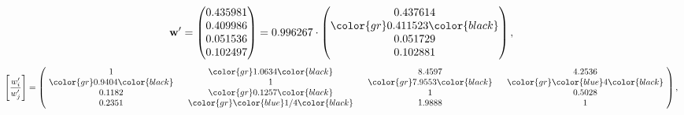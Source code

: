 \begin{example}
\begin{equation*}
\mathbf{w}^{\prime} =
\begin{pmatrix}
0.435981\\
0.409986\\
0.051536\\
0.102497
\end{pmatrix} =
0.996267\cdot
\begin{pmatrix}
0.437614\\
\color{gr} 0.411523\color{black} \\
0.051729\\
0.102881
\end{pmatrix},
\end{equation*}
\begin{equation*}
\left[ \frac{{w}^{\prime}_i}{{w}^{\prime}_j} \right] =
\begin{pmatrix}
$\,\,$ 1 $\,\,$ & $\,\,$\color{gr} 1.0634\color{black} $\,\,$ & $\,\,$8.4597$\,\,$ & $\,\,$4.2536$\,\,$ \\
$\,\,$\color{gr} 0.9404\color{black} $\,\,$ & $\,\,$ 1 $\,\,$ & $\,\,$\color{gr} 7.9553\color{black} $\,\,$ & $\,\,$\color{gr} \color{blue} 4\color{black}   $\,\,$ \\
$\,\,$0.1182$\,\,$ & $\,\,$\color{gr} 0.1257\color{black} $\,\,$ & $\,\,$ 1 $\,\,$ & $\,\,$0.5028 $\,\,$ \\
$\,\,$0.2351$\,\,$ & $\,\,$\color{gr} \color{blue}  1/4\color{black} $\,\,$ & $\,\,$1.9888$\,\,$ & $\,\,$ 1  $\,\,$ \\
\end{pmatrix},
\end{equation*}
\end{example}
\newpage
